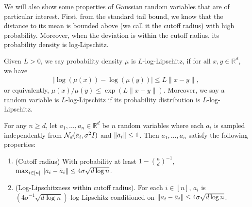 \documentclass{theoretics}
\newcommand{\R}{\mathbb R}
\begin{document}
We will also show some properties of Gaussian random variables that are of particular interest.
First, from the standard tail bound, we know that the distance to its mean is bounded above (we call it the cutoff radius) with high probability. Moreover, when the deviation is within the cutoff radius, its probability density is log-Lipschitz. 

\begin{definition}\label{def:log-lipschitz}
    Given $L > 0$, we say probability density $\mu$ is $L$-log-Lipschitz, if for all $x, y\in \R^d$, we have
    \begin{align*}
        |\log(\mu(x)) - \log(\mu(y))| \leq L\|x - y\|,
    \end{align*}
    or equivalently, $\mu(x) / \mu(y) \leq \exp(L\|x - y\|)$.
    Moreover, we say a random variable is $L$-log-Lipschitz if its probability distribution is $L$-log-Lipschitz.
\end{definition}

\begin{lemma}\label{lem:cutoff-lipschitz-gaussian}
    For any $n \geq d$,
    let $a_1, \ldots, a_n \in \R^d$ be $n$ random variables where each $a_i$ is sampled independently from $\mathcal{N}_d(\Bar{a}_i, \sigma^2 I)$ and $\|\Bar{a}_i\| \leq 1$. Then $a_1, \ldots, a_n$ satisfy the following properties:
    \begin{enumerate}
        \item (Cutoff radius) With probability at least $1 - \binom{n}{d}^{-1}$, $\max_{i \in [n]} \|a_i - \Bar{a}_i\| \leq 4\sigma \sqrt{d \log n}$.
        \item (Log-Lipschitzness within cutoff radius). For each $i \in [n]$, $a_i$ is $(4\sigma^{-1} \sqrt{d\log n})$-log-Lipschitz conditioned on $\|a_i - \Bar{a}_i\| \leq 4\sigma \sqrt{d \log n}$.
    \end{enumerate}
\end{lemma}
\end{document}
